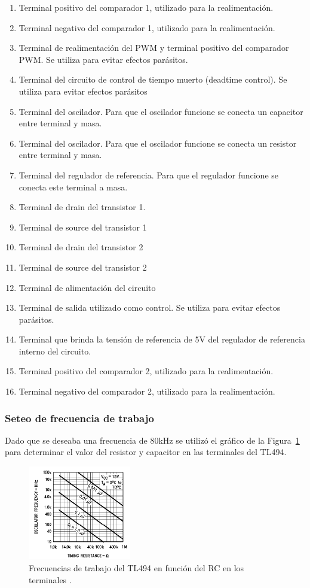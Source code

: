 \begin{enumerate}
\item Terminal positivo del comparador 1, utilizado para la realimentación.
\item Terminal negativo del comparador 1, utilizado para la realimentación.
\item Terminal de realimentación del PWM y terminal positivo del comparador PWM. Se utiliza para evitar efectos parásitos.
\item Terminal del circuito de control de tiempo muerto (deadtime control). Se utiliza para evitar efectos parásitos
\item Terminal del oscilador. Para que el oscilador funcione se conecta un capacitor entre terminal y masa.
\item Terminal del oscilador. Para que el oscilador funcione se conecta un resistor entre terminal y masa.
\item Terminal del regulador de referencia. Para que el regulador funcione se conecta este terminal a masa.
\item Terminal de drain del transistor 1. 
\item Terminal de source del transistor 1
\item Terminal de drain del transistor 2
\item Terminal de source del transistor 2
\item Terminal de alimentación del circuito
\item Terminal de salida utilizado como control. Se utiliza para evitar efectos parásitos.
\item  Terminal que brinda la tensión de referencia de 5V del regulador de referencia interno del circuito.
\item Terminal positivo del comparador 2, utilizado para la realimentación.
\item Terminal negativo del comparador 2, utilizado para la realimentación.
\end{enumerate}

\subsubsection{Seteo de frecuencia de trabajo}

Dado que se deseaba una frecuencia de 80kHz se utilizó el gráfico de la Figura~\ref{frec_tl494} para determinar el valor del resistor y capacitor en las terminales del TL494.

\begin{figure}[H]
\centering
\includegraphics[width=0.4\textwidth]{img/frec_TL494.png}
\caption{Frecuencias de trabajo del TL494 en función del RC en los terminales .}
\label{frec_tl494}
\end{figure}